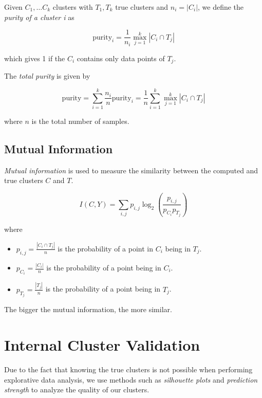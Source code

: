 Given \(C_1, \dots C_k\) clusters with \(T_1, T_k\) true clusters and \(n_i = |C_i|\), we define the \emph{purity of a cluster i} as

\[
	\mathrm{purity}_i = \frac{1}{n_i} \max_{j = 1}^{k} |C_i \cap T_j|
\]

which gives 1 if the \(C_i\) contains only data points of \(T_j\).

The \emph{total purity} is given by

\[
	\mathrm{purity} =  \sum_{i = 1}^{k} \frac{n_i}{n} \mathrm{purity}_i = \frac{1}{n} \sum_{i = 1}^{k} \max_{j = 1}^{k} |C_i \cap T_j|
\]

where \(n\) is the total number of samples.

\subsection{Mutual Information}

\emph{Mutual information} is used to measure the similarity between the computed and true clusters \(C\) and \(T\).

\[
	I(C, Y) = \sum_{i,j} p_{i, j} \log_2 \left(\frac{p_{i,j}}{p_{C_i} p_{T_j}}\right)
\]

where

\begin{itemize}

	\item \(p_{i,j} = \frac{|C_i \cap T_j|}{n}\) is the probability of a point in \(C_i\) being in \(T_j\).

	\item \(p_{C_i} = \frac{|C_i|}{n}\) is the probability of a point being in \(C_i\).

	\item \(p_{T_j} = \frac{|T_j|}{n}\) is the probability of a point being in \(T_j\).

\end{itemize}

The bigger the mutual information, the more similar.

\section{Internal Cluster Validation}

Due to the fact that knowing the true clusters is not possible when performing explorative data analysis, we use
methods such as \emph{silhouette plots} and \emph{prediction strength} to analyze the quality of our clusters.

